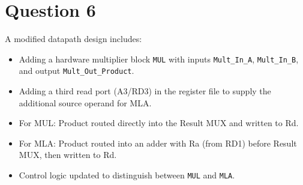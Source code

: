 \documentclass[12pt,a4paper]{article}
\begin{document}
\section*{Question 6}
A modified datapath design includes:
\begin{itemize}
\item Adding a hardware multiplier block \texttt{MUL} with inputs \texttt{Mult\_In\_A}, \texttt{Mult\_In\_B}, and output \texttt{Mult\_Out\_Product}.
\item Adding a third read port (A3/RD3) in the register file to supply the additional source operand for MLA.
\item For MUL: Product routed directly into the Result MUX and written to Rd.
\item For MLA: Product routed into an adder with Ra (from RD1) before Result MUX, then written to Rd.
\item Control logic updated to distinguish between \texttt{MUL} and \texttt{MLA}.
\end{itemize}
\end{document}
